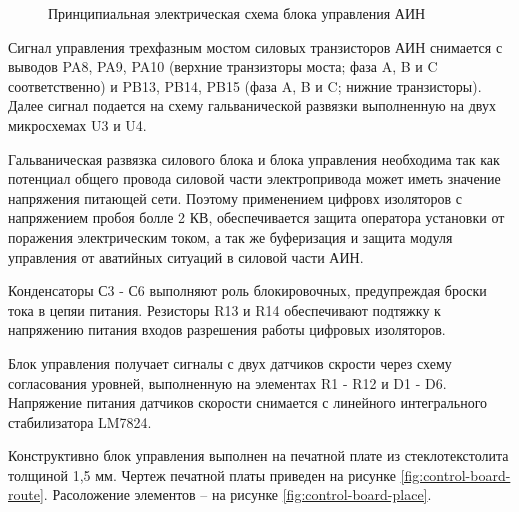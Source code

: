         \begin{figure}
            \caption{Принципиальная электрическая схема блока управления АИН}
            \label{fig:control-schematic}
        \end{figure}

        Сигнал управления трехфазным мостом силовых транзисторов АИН снимается
        с выводов PA8, PA9, PA10 (верхние транзизторы моста; фаза A, B и C
        соответственно) и PB13, PB14, PB15 (фаза A, B и C; нижние транзисторы).
        Далее сигнал подается на схему гальванической развязки выполненную на
        двух микросхемах U3 и U4. 
        
        Гальваническая развязка силового блока и блока управления необходима
        так как потенциал общего провода силовой части электропривода может
        иметь значение напряжения питающей сети. Поэтому применением цифровх
        изоляторов с напряжением пробоя болле 2 КВ, обеспечивается защита
        оператора установки от поражения электрическим током, а так же
        буферизация и защита модуля управления от аватийных ситуаций в силовой
        части АИН.

        Конденсаторы С3 - С6 выполняют роль блокировочных, предупреждая броски
        тока в цепяи питания. Резисторы R13 и R14 обеспечивают подтяжку к
        напряжению питания входов разрешения работы цифровых изоляторов.

        Блок управления получает сигналы с двух датчиков скрости через схему
        согласования уровней, выполненную на элементах R1 - R12 и D1 - D6.
        Напряжение питания датчиков скорости снимается с линейного
        интегрального стабилизатора LM7824.

        Конструктивно блок управления выполнен на печатной плате из
        стеклотекстолита толщиной 1,5 мм. Чертеж печатной платы приведен на
        рисунке \ref{fig:control-board-route}. Расоложение элементов -- на
        рисунке \ref{fig:control-board-place}.

